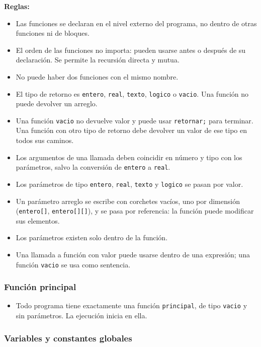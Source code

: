\documentclass[spanish,11pt,letterpaper]{article}
\begin{document}
	\textbf{Reglas:}
	\begin{itemize}
		\item Las funciones se declaran en el nivel externo del programa, no
		dentro de otras funciones ni de bloques.
		\item El orden de las funciones no importa: pueden usarse antes o
		despu\'es de su declaraci\'on. Se permite la recursi\'on directa
		y mutua.
		\item No puede haber dos funciones con el mismo nombre.
		\item El tipo de retorno es \texttt{entero}, \texttt{real},
		\texttt{texto}, \texttt{logico} o \texttt{vacio}. Una funci\'on no
		puede devolver un arreglo.
		\item Una funci\'on \texttt{vacio} no devuelve valor y puede usar
		\texttt{retornar;} para terminar. Una funci\'on con otro tipo de
		retorno debe devolver un valor de ese tipo en todos sus caminos.
		\item Los argumentos de una llamada deben coincidir en n\'umero y tipo con
		los par\'ametros, salvo la conversi\'on de \texttt{entero} a
		\texttt{real}.
		\item Los par\'ametros de tipo \texttt{entero}, \texttt{real},
		\texttt{texto} y \texttt{logico} se pasan por valor.
		\item Un par\'ametro arreglo se escribe con corchetes vac\'ios, uno por
		dimensi\'on (\texttt{entero[]}, \texttt{entero[][]}), y se pasa por
		referencia: la funci\'on puede modificar sus elementos.
		\item Los par\'ametros existen solo dentro de la funci\'on.
		\item Una llamada a funci\'on con valor puede usarse dentro de una
		expresi\'on; una funci\'on \texttt{vacio} se usa como sentencia.
	\end{itemize}
	
	\subsubsection*{Funci\'on principal}
	
	\begin{itemize}
		\item Todo programa tiene exactamente una funci\'on \texttt{principal},
		de tipo \texttt{vacio} y sin par\'ametros. La ejecuci\'on inicia
		en ella.
	\end{itemize}
	
	\clearpage
	
	\subsubsection*{Variables y constantes globales}
	
\end{document}
